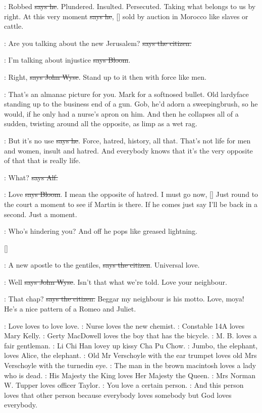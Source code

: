 \Bloom:
Robbed \sout{says he}. Plundered. Insulted.
Persecuted. Taking what belongs
to us by right. At this very moment \sout{says he},
[]
sold by auction in Morocco like slaves or cattle.

\citizen:
Are you talking about the new Jerusalem?
\sout{says the citizen.}

\Bloom:
I'm talking about injustice \sout{says Bloom}.

\johnwyse:
Right, \sout{says John Wyse}.
Stand up to it then with force like men.

\Nq:
That's an almanac picture for you. Mark for a softnosed bullet. Old
lardyface standing up to the business end of a gun. Gob, he'd adorn a
sweepingbrush, so he would, if he only had a nurse's apron on him. And
then he collapses all of a sudden, twisting around all the opposite, as
limp as a wet rag.

\Bloom:
But it's no use \sout{says he}.
Force, hatred, history, all that. That's not
life for men and women, insult and hatred. And everybody knows that it's
the very opposite of that that is really life.

\bergan:
What? \sout{says Alf.}

\Bloom:
Love \sout{says Bloom}.
I mean the opposite of hatred. I must go now,
[]
Just round to the court a moment to see if Martin is there.
If he comes just say I'll be back in a second. Just a moment.

\Nq:
Who's hindering you? And off he pops like greased lightning.

[]

\citizen:
A new apostle to the gentiles, \sout{says the citizen}.
Universal love.

\johnwyse:
Well \sout{says John Wyse}.
Isn't that what we're told. Love your neighbour.

\citizen:
That chap? \sout{says the citizen.}
Beggar my neighbour is his motto. Love,
moya! He's a nice pattern of a Romeo and Juliet.

:
Love loves to love love.
:
Nurse loves the new chemist. 
:
Constable 14A loves Mary Kelly. 
:
Gerty MacDowell loves the boy that has the bicycle. 
:
M. B. loves a fair gentleman. 
:
Li Chi Han lovey up kissy Cha Pu Chow. 
:
Jumbo, the elephant, loves Alice, the elephant. 
:
Old Mr Verschoyle with the ear trumpet loves
old Mrs Verschoyle with the turnedin eye. 
:
The man in the brown macintosh loves a lady who is dead. 
:
His Majesty the King loves Her Majesty the Queen. 
:
Mrs Norman W. Tupper loves officer Taylor. 
:
You love a certain person. 
:
And this person loves that other person because everybody loves somebody
but God loves everybody.

